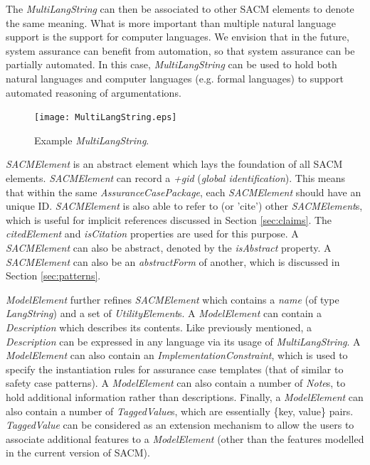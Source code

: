 The \textit{MultiLangString} can then be associated to other SACM elements to denote the same meaning. 
What is more important than multiple natural language support is the support for computer languages. 
We envision that in the future, system assurance can benefit from automation, so that system assurance can be partially automated. In this case, \textit{MultiLangString} can be used to hold both natural languages and computer languages (e.g. formal languages) to support automated reasoning of argumentations. 

\begin{figure}
	\centering
	\texttt{[image: MultiLangString.eps]}
	\caption{Example \textit{MultiLangString}.}
	\label{fig:mulitiLang}
\end{figure}

\textit{SACMElement} is an abstract element which lays the foundation of all SACM elements. \textit{SACMElement} can record a \textit{+gid} (\textit{global identification}). 
This means that within the same \textit{AssuranceCasePackage}, each \textit{SACMElement} should have an unique ID. 
\textit{SACMElement} is also able to refer to (or 'cite') other \textit{SACMElement}s, which is useful for implicit references discussed in Section \ref{sec:claims}. 
The \textit{citedElement} and \textit{isCitation} properties are used for this purpose. 
A \textit{SACMElement} can also be abstract, denoted by the \textit{isAbstract} property. 
A \textit{SACMElement} can also be an \textit{abstractForm} of another, which is discussed in Section \ref{sec:patterns}. 

\textit{ModelElement} further refines \textit{SACMElement} which contains a \textit{name} (of type \textit{LangString}) and a set of \textit{UtilityElement}s. 
A \textit{ModelElement} can contain a \textit{Description} which describes its contents. Like previously mentioned, a \textit{Description} can be expressed in any language via its usage of \textit{MultiLangString}. 
A \textit{ModelElement} can also contain an \textit{ImplementationConstraint}, which is used to specify the instantiation rules for assurance case templates (that of similar to safety case patterns).
A \textit{ModelElement} can also contain a number of \textit{Note}s, to hold additional information rather than descriptions. 
Finally, a \textit{ModelElement} can also contain a number of \textit{TaggedValue}s, which are essentially \{key, value\} pairs. 
\textit{TaggedValue} can be considered as an extension mechanism to allow the users to associate additional features to a \textit{ModelElement} (other than the features modelled in the current version of SACM).


